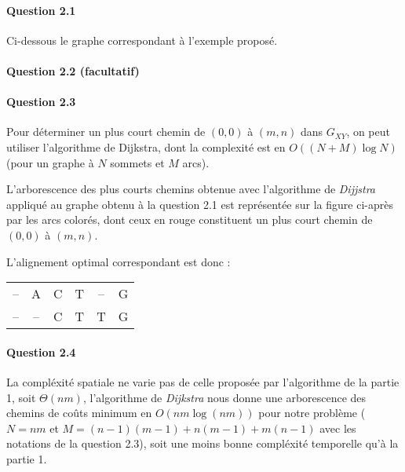 \paragraph{Question 2.1}
Ci-dessous le graphe correspondant \`a l'exemple propos\'e.

\pagebreak

\paragraph{Question 2.2 (facultatif)}

\paragraph{Question 2.3}
Pour d\'eterminer un plus court chemin de $(0,0)$ \`a $(m,n)$ dans
$G_{XY}$, on peut utiliser l'algorithme de Dijkstra, dont la
complexit\'e est en $O((N+M)\log N)$ (pour un graphe \`a $N$ sommets
et $M$ arcs).

L'arborescence des plus courts chemins obtenue avec l'algorithme de
\emph{Dijjstra} appliqu\'e au graphe obtenu \`a la question 2.1 est
repr\'esent\'ee sur la figure ci-apr\`es par les arcs color\'es, dont
ceux en rouge constituent un plus court chemin de $(0,0)$ \`a $(m,n)$.


L'alignement optimal correspondant est donc :
\begin{table*}[h]
  \centering
  \begin{tabular}{c|ccccc}
    \hline
    --&A&C&T&--&G\\
    --&--&C&T&T&G\\
    \hline
  \end{tabular}
\end{table*}

\paragraph{Question 2.4}
La compl\'exit\'e spatiale ne varie pas de celle propos\'ee par
l'algorithme de la partie 1, soit $\Theta(nm)$, l'algorithme de
\emph{Dijkstra} nous donne une arborescence des chemins de co\^uts
minimum en $O(nm\log(nm))$ pour notre probl\`eme ($N=nm$ et
$M=(n-1)(m-1)+n(m-1)+m(n-1)$ avec les notations de la question 2.3),
soit une moins bonne compl\'exit\'e temporelle qu'\`a la partie 1.

